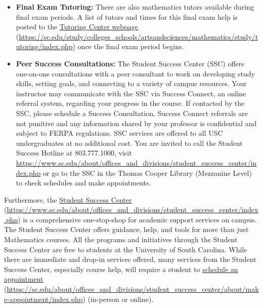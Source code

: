 \documentclass[11pt,letterpaper]{article}
\begin{document}
\begin{itemize}
	\item {\bfseries Final Exam Tutoring:} There are also mathematics tutors available during final exam periods. A list of tutors and times for this final exam help is posted to the \href{https://sc.edu/study/colleges\_schools/artsandsciences/mathematics/study/tutoring/index.php}{Tutoring Center webpage} (\url{https://sc.edu/study/colleges\_schools/artsandsciences/mathematics/study/tutoring/index.php}) once the final exam period begins. 
	
	\item {\bfseries Peer Success Consultations:} The Student Success Center (SSC) offers one-on-one consultations with a peer consultant to work on developing study skills, setting goals, and connecting to a variety of campus resources. Your instructor may communicate with the SSC via Success Connect, an online referral system, regarding your progress in the course. If contacted by the SSC, please schedule a Success Consultation. Success Connect referrals are not punitive and any information shared by your professor is confidential and subject to FERPA regulations. SSC services are offered to all USC undergraduates at no additional cost. You are invited to call the Student Success Hotline at 803.777.1000, visit \url{https://www.sc.edu/about/offices\_and\_divisions/student\_success\_center/index.php} or go to the SSC in the Thomas Cooper Library (Mezzanine Level) to check schedules and make appointments.
	\end{itemize} \pspace

Furthermore, the \href{https://www.sc.edu/about/offices\_and\_divisions/student\_success\_center/index.php}{Student Success Center} (\url{https://www.sc.edu/about/offices\_and\_divisions/student\_success\_center/index.php}) is a comprehensive one-stop-shop for academic support services on campus. The Student Success Center offers guidance, help, and tools for more than just Mathematics courses. All the programs and initiatives through the Student Success Center are free to students at the University of South Carolina. While there are immediate and drop-in services offered, many services from the Student Success Center, especially course help, will require a student to \href{https://sc.edu/about/offices\_and\_divisions/student\_success\_center/about/make-appointment/index.php}{schedule an appointment} (\url{https://sc.edu/about/offices\_and\_divisions/student\_success\_center/about/make-appointment/index.php}) (in-person or online). 
\sectionbreak
\end{document}
